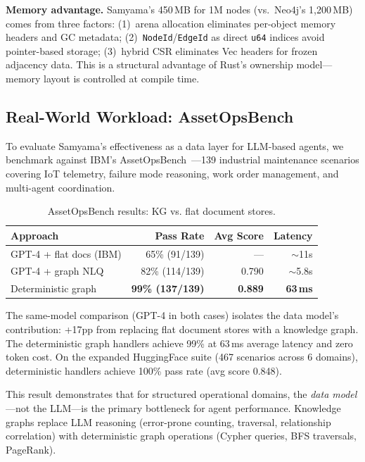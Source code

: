 \documentclass[sigconf, nonacm]{acmart}
\begin{document}
\textbf{Memory advantage.}
Samyama's 450\,MB for 1M nodes (vs.\ Neo4j's 1,200\,MB) comes from three factors:
(1)~arena allocation eliminates per-object memory headers and GC metadata;
(2)~\texttt{NodeId}/\texttt{EdgeId} as direct \texttt{u64} indices avoid pointer-based storage;
(3)~hybrid CSR eliminates Vec headers for frozen adjacency data.
This is a structural advantage of Rust's ownership model---memory layout is controlled at compile time.

\subsection{Real-World Workload: AssetOpsBench}
\label{sec:assetops}

To evaluate Samyama's effectiveness as a data layer for LLM-based agents, we benchmark against IBM's AssetOpsBench~\cite{patel2025assetops}---139 industrial maintenance scenarios covering IoT telemetry, failure mode reasoning, work order management, and multi-agent coordination.

\begin{table}[!htbp]
\caption{AssetOpsBench results: KG vs. flat document stores.}
\label{tab:assetops}
\begin{tabular}{lrrr}
\toprule
\textbf{Approach} & \textbf{Pass Rate} & \textbf{Avg Score} & \textbf{Latency} \\
\midrule
GPT-4 + flat docs (IBM) & 65\% (91/139) & --- & ${\sim}$11s \\
GPT-4 + graph NLQ & 82\% (114/139) & 0.790 & ${\sim}$5.8s \\
Deterministic graph & \textbf{99\% (137/139)} & \textbf{0.889} & \textbf{63\,ms} \\
\bottomrule
\end{tabular}
\end{table}

\noindent
The same-model comparison (GPT-4 in both cases) isolates the data model's contribution: +17pp from replacing flat document stores with a knowledge graph.
The deterministic graph handlers achieve 99\% at 63\,ms average latency and zero token cost.
On the expanded HuggingFace suite (467 scenarios across 6 domains), deterministic handlers achieve 100\% pass rate (avg score 0.848).

This result demonstrates that for structured operational domains, the \emph{data model}---not the LLM---is the primary bottleneck for agent performance.
Knowledge graphs replace LLM reasoning (error-prone counting, traversal, relationship correlation) with deterministic graph operations (Cypher queries, BFS traversals, PageRank).
\end{document}
